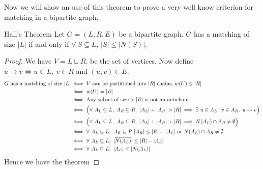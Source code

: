 Now we will show an use of this theorem to prove a very well know criterion for matching in a bipartite graph.
\begin{Theorem}{Hall's Theorem}{}
	Let $G=(L,R,E)$ be a bipartite graph. $G$ has a matching of size $|L|$ if and only if $\forall \ S\subseteq L$, $|S|\leq |N(S)|$.
\end{Theorem}
\begin{proof}
	We have  $V=L\sqcup R$. be the set of vertices. Now define $u\to v\iff u\in L,\ v\in R$ and $(u,v)\in E$. \begin{align*}
		G\text{ has a matching of size }|L|&\iff V\text{ can be partitioned into }|R|\text{ chains, }w(U)\leq |R|\\
		&\iff w(U)=|R|\\
		&\iff \text{Any subset of size}>|R|\text{ is not an antichain}\\
		& \iff \Big(\forall\ A_L\subseteq L,\ A_R\subseteq R,\ |A_L|+|A_R|>|R|\implies \exs\ u\in A_L,\ v\in A_R,\ u\to v\Big)\\
		& \iff \Big(\forall\ A_L\subseteq L,\ A_R\subseteq R,\ |A_L|+|A_R|>|R|\implies N(A_L)\cap A_R\neq\emptyset\Big)\\
		& \iff \forall\ A_L\subseteq L,\ A_R\subseteq R\ |A_R|\leq |R|-|A_L| \text{ or }N(A_L)\cap A_R\neq\emptyset\\
		& \iff \forall\ A_L\subseteq L,\ |\ov{N(A_L)}|\leq |R|-|A_L|\\
		& \iff \forall\ A_L\subseteq L,\ |A_L|\leq |N(A_L)|
	\end{align*}Hence we have the theorem
\end{proof}
